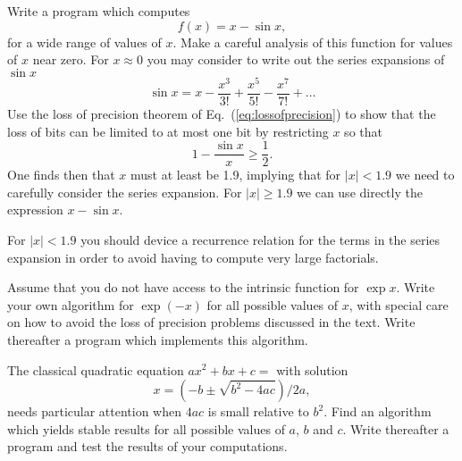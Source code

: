 \begin{prob}
Write a program which computes 
\[
   f(x) = x -\sin{x},
\]
for a wide range of values of $x$.  Make a careful analysis of this function for values
of $x$ near zero. For $x \approx 0$ you may consider to write out the series expansions of 
$\sin{x}$
\[
   \sin{x} = x -\frac{x^3}{3!}+\frac{x^5}{5!}-\frac{x^7}{7!}+\dots
\]
Use the loss of precision theorem of Eq.~(\ref{eq:lossofprecision})  to show that the loss of bits 
can be limited to at most one bit by restricting $x$ so that
\[
  1-\frac{\sin{x}}{x}  \ge \frac{1}{2}.
\]
One finds then that $x$ must at least be 1.9, implying that for $|x| < 1.9$ we need to carefully
consider the series expansion. For $|x|\ge 1.9$ we can use directly the expression
$x-\sin{x}$.  

For $|x| < 1.9$ you should device a recurrence relation for the terms in the series
expansion in order to avoid having to compute very large factorials.
\end{prob}


\begin{prob}
Assume that you do not have access to the intrinsic function for $\exp{x}$. Write your own
algorithm for $\exp{(-x)}$  for all possible values of $x$, with special care on how to 
avoid the loss of precision problems
discussed in the text.  Write thereafter a program which implements this algorithm.
\end{prob}


\begin{prob}
The classical quadratic equation $ax^2+bx+c=$ with solution
\[
      x = \left(-b\pm \sqrt{b^2-4ac}\right)/2a,
\]
needs particular attention when $4ac$ is small relative to $b^2$. Find an algorithm which 
yields stable results for all possible values of $a$, $b$ and $c$. Write thereafter a program and 
test the results of your computations.
\end{prob}


